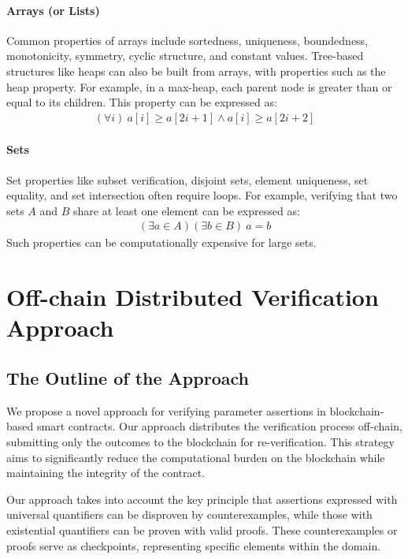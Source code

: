 \documentclass[runningheads]{llncs}
\begin{document}
\paragraph{\textbf{Arrays (or Lists)}}
Common properties of arrays include sortedness, uniqueness, boundedness, monotonicity, symmetry, cyclic structure, and constant values. %
Tree-based structures like heaps can also be built from arrays, with properties such as the heap property. For example, in a max-heap, each parent node is greater than or equal to its children. This property can be expressed as:
\begin{gather*}
(\forall i) \ a[i] \geq a[2i+1] \land a[i] \geq a[2i+2]
\end{gather*}
\paragraph{\textbf{Sets}}
Set properties like subset verification, disjoint sets, element uniqueness, set equality, and set intersection often require loops. For example, verifying that two sets \(A\) and \(B\) share at least one element can be expressed as:
\begin{gather*}
(\exists a \in A) (\exists b \in B)\ a = b
\end{gather*}
Such properties can be computationally expensive for large sets.
\section{Off-chain Distributed Verification Approach}
\label{sec:offchain-distributed-verification-approach}
\subsection{The Outline of the Approach}
We propose a novel approach for verifying parameter assertions in blockchain-based smart contracts. Our approach distributes the verification process off-chain, submitting only the outcomes to the blockchain for re-verification. This strategy aims to significantly reduce the computational burden on the blockchain while maintaining the integrity of the contract.

Our approach takes into account the key principle that assertions expressed with universal quantifiers can be disproven by counterexamples, while those with existential quantifiers can be proven with valid proofs. These counterexamples or proofs serve as checkpoints, representing specific elements within the domain. 
\end{document}
